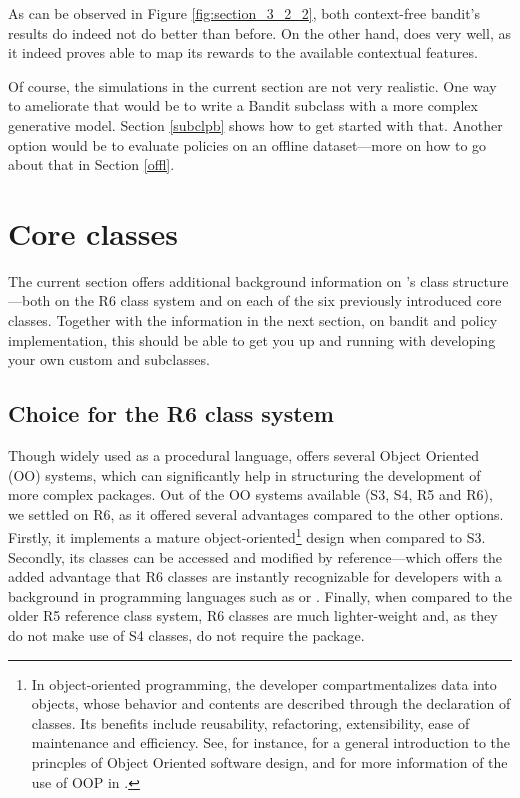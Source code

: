 \documentclass{jss}
\begin{document}
As can be observed in Figure \ref{fig:section_3_2_2}, both context-free bandit's results do indeed not do better than before. On the other hand,  does very well, as it indeed proves able to map its rewards to the available contextual features.

Of course, the simulations in the current section are not very realistic. One way to ameliorate that would be to write a Bandit subclass with a more complex generative model. Section \ref{subclpb} shows how to get started with that. Another option would be to evaluate policies on an offline dataset---more on how to go about that in Section \ref{offl}.

\section{Core classes} \label{classstructure}

The current section offers additional background information on 's class structure---both on the R6 class system \cite{R6} and on each of the six previously introduced core  classes. Together with the information in the next section, on bandit and policy implementation, this should be able to get you up and running with developing your own custom  and  subclasses.

\subsection{Choice for the R6 class system} \label{classsystem}

Though widely used as a procedural language,  offers several Object Oriented (OO) systems, which can significantly help in structuring the development of more complex packages. Out of the OO systems available (S3, S4, R5 and R6), we settled on R6, as it offered several advantages compared to the other options. Firstly, it implements a mature object-oriented\footnote{In object-oriented programming, the developer compartmentalizes data into objects, whose behavior and contents are described through the declaration of classes. Its benefits include reusability, refactoring, extensibility, ease of maintenance and efficiency. See, for instance, \cite{Wirfs-Brock1990} for a general introduction to the princples of Object Oriented software design, and \cite{wickham2014advanced} for more information of the use of OOP in .} design when compared to S3. Secondly, its classes can be accessed and modified by reference---which offers the added advantage that R6 classes are instantly recognizable for developers with a background in programming languages such as  or . Finally, when compared to the older R5 reference class system, R6 classes are much lighter-weight and, as they do not make use of S4 classes, do not require the  package.
\end{document}
